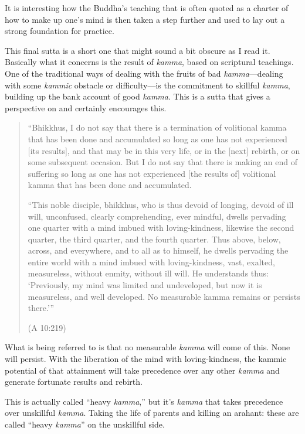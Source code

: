 It is interesting how the Buddha’s teaching that is often quoted as a
charter of how to make up one’s mind is then taken a step further and
used to lay out a strong foundation for practice.

This final sutta is a short one that might sound a bit obscure as I read
it. Basically what it concerns is the result of \emph{kamma}, based on
scriptural teachings. One of the traditional ways of dealing with the
fruits of bad \emph{kamma}—dealing with some \emph{kammic} obstacle or
difficulty—is the commitment to skillful \emph{kamma}, building up the
bank account of good \emph{kamma}. This is a sutta that gives a
perspective on and certainly encourages this.

\begin{quotation}
“Bhikkhus, I do not say that there is a termination of volitional kamma
that has been done and accumulated so long as one has not experienced
{[}its results{]}, and that may be in this very life, or in the
{[}next{]} rebirth, or on some subsequent occasion. But I do not say
that there is making an end of suffering so long as one has not
experienced {[}the results of{]} volitional kamma that has been done and
accumulated.

“This noble disciple, bhikkhus, who is thus devoid of longing, devoid of
ill will, unconfused, clearly comprehending, ever mindful, dwells
pervading one quarter with a mind imbued with loving-kindness, likewise
the second quarter, the third quarter, and the fourth quarter. Thus
above, below, across, and everywhere, and to all as to himself, he
dwells pervading the entire world with a mind imbued with
loving-kindness, vast, exalted, measureless, without enmity, without ill
will. He understands thus: ‘Previously, my mind was limited and
undeveloped, but now it is measureless, and well developed. No
measurable kamma remains or persists there.’”

(A 10:219)
\end{quotation}

What is being referred to is that no measurable \emph{kamma} will come
of this. None will persist. With the liberation of the mind with
loving-kindness, the kammic potential of that attainment will take
precedence over any other \emph{kamma} and generate fortunate results
and rebirth.

This is actually called “heavy \emph{kamma},” but it’s \emph{kamma} that
takes precedence over unskillful \emph{kamma}. Taking the life of
parents and killing an arahant: these are called “heavy \emph{kamma}” on
the unskillful side.

